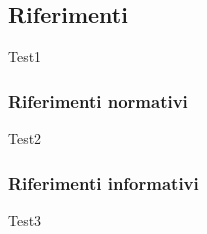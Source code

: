 \subsection{Riferimenti}
\label{subsec:Riferimenti}

Test1

\subsubsection{Riferimenti normativi}
\label{subsubsec:RiferimentiNormativi}

Test2

\subsubsection{Riferimenti informativi}
\label{subsubsec:RiferimentiInformativi}

Test3